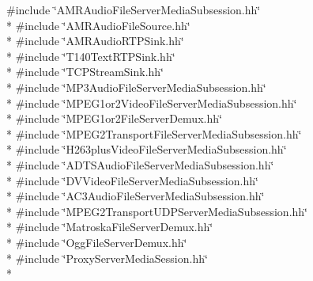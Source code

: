 {\ttfamily \#include \char`\"{}A\+M\+R\+Audio\+File\+Server\+Media\+Subsession.\+hh\char`\"{}}\\*
{\ttfamily \#include \char`\"{}A\+M\+R\+Audio\+File\+Source.\+hh\char`\"{}}\\*
{\ttfamily \#include \char`\"{}A\+M\+R\+Audio\+R\+T\+P\+Sink.\+hh\char`\"{}}\\*
{\ttfamily \#include \char`\"{}T140\+Text\+R\+T\+P\+Sink.\+hh\char`\"{}}\\*
{\ttfamily \#include \char`\"{}T\+C\+P\+Stream\+Sink.\+hh\char`\"{}}\\*
{\ttfamily \#include \char`\"{}M\+P3\+Audio\+File\+Server\+Media\+Subsession.\+hh\char`\"{}}\\*
{\ttfamily \#include \char`\"{}M\+P\+E\+G1or2\+Video\+File\+Server\+Media\+Subsession.\+hh\char`\"{}}\\*
{\ttfamily \#include \char`\"{}M\+P\+E\+G1or2\+File\+Server\+Demux.\+hh\char`\"{}}\\*
{\ttfamily \#include \char`\"{}M\+P\+E\+G2\+Transport\+File\+Server\+Media\+Subsession.\+hh\char`\"{}}\\*
{\ttfamily \#include \char`\"{}H263plus\+Video\+File\+Server\+Media\+Subsession.\+hh\char`\"{}}\\*
{\ttfamily \#include \char`\"{}A\+D\+T\+S\+Audio\+File\+Server\+Media\+Subsession.\+hh\char`\"{}}\\*
{\ttfamily \#include \char`\"{}D\+V\+Video\+File\+Server\+Media\+Subsession.\+hh\char`\"{}}\\*
{\ttfamily \#include \char`\"{}A\+C3\+Audio\+File\+Server\+Media\+Subsession.\+hh\char`\"{}}\\*
{\ttfamily \#include \char`\"{}M\+P\+E\+G2\+Transport\+U\+D\+P\+Server\+Media\+Subsession.\+hh\char`\"{}}\\*
{\ttfamily \#include \char`\"{}Matroska\+File\+Server\+Demux.\+hh\char`\"{}}\\*
{\ttfamily \#include \char`\"{}Ogg\+File\+Server\+Demux.\+hh\char`\"{}}\\*
{\ttfamily \#include \char`\"{}Proxy\+Server\+Media\+Session.\+hh\char`\"{}}\\*
